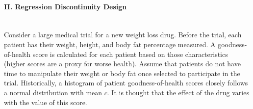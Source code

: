 \documentclass{article}
\begin{document}
\paragraph{\Large II. Regression Discontinuity Design \\ \\}
\vspace{1em} 

\noindent Consider a large medical trial for a new weight loss
drug.  Before the trial, each patient has their weight, height, and
body fat percentage measured.  A goodness-of-health score is
calculated for each patient based on those characteristics (higher
scores are a proxy for worse health).  Assume that patients do not
have time to manipulate their weight or body fat once selected to
participate in the trial.  Historically, a histogram of patient
goodness-of-health scores closely follows a normal distribution with
mean $c$.  It is thought that the effect of the drug varies with the
value of this score.
\end{document}
